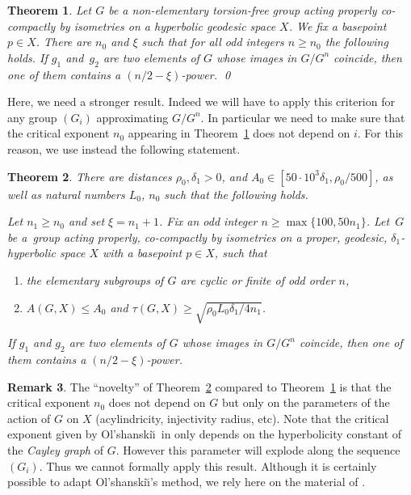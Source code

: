 \documentclass[JEP,XML,SOM,Unicode, NoEqCountersInSection,published]{cedram}
\theoremstyle{plain}
\newtheorem{thm}{Theorem}[section]
\theoremstyle{definition}
\newtheorem{rem}[thm]{Remark}
\begin{document}
\begin{thm}
\label{T: non-triviality of Burnside groups}
Let $G$ be a non-elementary torsion-free group acting properly co-compactly by isometries on a hyperbolic geodesic space $X$.
We fix a basepoint $p \in X$.
There are $n_0$ and $\xi$ such that for all odd integers $n\geqslant n_0$ the following holds.
If $g_1$ and~$g_2$ are two elements of $G$ whose images in $G/G^n$ coincide, then one of them contains a $(n/2-\xi)$-power. \qed
\end{thm}

Here, we need a stronger result.
Indeed we will have to apply this criterion for any group $(G_i)$ approximating $G/G^n$.
In particular we need to make sure that the critical exponent $n_0$ appearing in Theorem~\ref{T: non-triviality of Burnside groups} does not depend on $i$.
For this reason, we use instead the following statement.

\begin{thm}
\label{T: uniform non-triviality of Burnside groups}
There are distances $\rho_0,\delta_1> 0$, and $A_0 \in [50 \cdot 10^3\delta_1, \rho_0/500]$, as well as natural numbers $L_0$, $n_0$ such that the following holds.

Let $n_1 \geq n_0$ and set $\xi = n_1+ 1$.
Fix an odd integer $n \geq \max\{100, 50n_1\}$.
Let~$G$ be a~group acting properly, co-compactly by isometries on a proper, geodesic, $\delta_1$-hyperbolic space $X$ with a basepoint $p \in X$, such that
\begin{enumerate}
\item
the elementary subgroups of $G$ are cyclic or finite of odd order $n$,
\item
$A(G,X)\leqslant A_0$ and $\tau(G,X)\geqslant \sqrt{\rho_0 L_0 \delta_1/4n_1}$.
\end{enumerate}
If $g_1$ and $g_2$ are two elements of $G$ whose images in $G/G^n$ coincide, then one of them contains a $(n/2-\xi)$-power.
\end{thm}

\begin{rem}
The ``novelty'' of Theorem~\ref{T: uniform non-triviality of Burnside groups} compared to Theorem~\ref{T: non-triviality of Burnside groups} is that the critical exponent $n_0$ does not depend on $G$ but only on the parameters of the action of $G$ on $X$ (acylindricity, injectivity radius, etc).
Note that the critical exponent given by Ol'shanski\u\i\ in \cite{olshanskii_periodic_1991} only depends on the hyperbolicity constant of the \emph{Cayley graph} of $G$.
However this parameter will explode along the sequence $(G_i)$.
Thus we cannot formally apply this result.
Although it is certainly possible to adapt Ol'shanski\u\i's method, we rely here on the material of \cite{coulon_detecting_2018}.
\end{rem}
\end{document}
